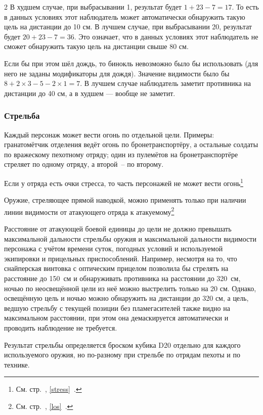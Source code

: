 \documentclass[twoside]{article}
\begin{document}
\begin{multicols}{2}
В худшем случае, при выбрасывании 1, результат будет $1+23-7=17$.
То есть в данных условиях этот наблюдатель может автоматически
обнаружить такую цель на дистанции до 10 см. В лучшем случае, при
выбрасывании 20, результат будет $20+23-7=36$. Это означает, что в
данных условиях этот наблюдатель не сможет обнаружить такую цель на
дистанции свыше 80 см.

Если бы при этом шёл дождь, то бинокль невозможно было бы использовать
(для него не заданы модификаторы для дождя). Значение видимости было бы
$8+2×3-5-2×1=7$. В лучшем случае наблюдатель заметит
противника на дистанции до 40 см, а в худшем --- вообще не заметит.

\subsubsection{Стрельба}\label{shooting}

Каждый персонаж может вести огонь по отдельной цели. Примеры:
гранатомётчик отделения ведёт огонь по бронетранспортёру, а остальные
солдаты по вражескому пехотному отряду; один из пулемётов на
бронетранспортёре стреляет по одному отряду, а второй~-- по второму.

Если у отряда есть очки стресса, то часть персонажей не может вести
огонь\footnote{См. стр.~\pageref{stress}, \ref{stress}~.}

Оружие, стреляющее прямой наводкой, можно применять только при наличии
линии видимости от атакующего отряда к атакуемому\footnote{См. стр.~\pageref{los}, \ref{los}~.}

Расстояние от атакующей боевой единицы до цели не должно превышать
максимальной дальности стрельбы оружия и максимальной дальности
видимости персонажа с учётом времени суток, погодных условий и
используемой экипировки и прицельных приспособлений. Например, несмотря
на то, что снайперская винтовка с оптическим прицелом позволила бы
стрелять на расстояние до 150~см и обнаруживать противника на расстоянии
до 320~см, ночью по неосвещённой цели из неё можно выстрелить только на
20 см. Однако, освещённую цель и ночью можно обнаружить на дистанции до
320 см, а цель, ведшую стрельбу с текущей позиции без пламегасителей
также видно на максимальном расстоянии, при этом она
демаскируется автоматически и проводить наблюдение не требуется.

Результат стрельбы определяется броском кубика D20 отдельно для каждого
используемого оружия, но по-разному при стрельбе по отрядам пехоты и по
технике.


\end{multicols}
\end{document}
